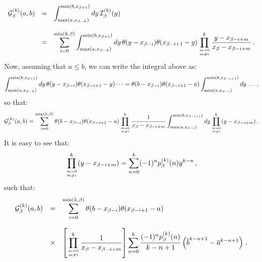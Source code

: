 \documentclass[10pt,a4paper]{article}
\begin{document}
\begin{equation}
\begin{array}{rcl}
\displaystyle \mathcal{G}_\beta^{(k)}(a,b) &=& \displaystyle
                                               \int_{{\rm
                                               max}(a,x_{\beta-k})}^{{\rm
                                               min}(b,x_{\beta+1})}
                                               dy\,\mathcal{I}_\beta^{(k)}(y)\\
\\
&=&\displaystyle 
\sum_{i=0}^{{\rm min}(k,\beta)}
  \int_{{\rm max}(a,x_{\beta-k})}^{{\rm min}(b,x_{\beta+1})}dy\,\theta(y-x_{\beta-i})\theta(x_{\beta-i+1}-y)
  \prod^{k}_{m=0\atop m\ne
    i}\frac{y-x_{\beta-i+m}}{x_{\beta}-x_{\beta-i+m}}\,.
\end{array}
\end{equation}
Now, assuming that $a\leq b$, we can write the integral above as:
\begin{equation}
\int_{{\rm max}(a,x_{\beta-k})}^{{\rm min}(b,x_{\beta+1})} dy\,\theta(y-x_{\beta-i})\theta(x_{\beta-i+1}-y)\dots
=\theta(b-x_{\beta-i})\theta(x_{\beta-i+1}-a)\int_{{\rm max}(a,x_{\beta-i})}^{{\rm min}(b,x_{\beta-i+1})}dy\dots\,,
\end{equation}
so that:
\begin{equation}
\mathcal{G}_\beta^{(k)}(a,b) = \sum_{i=0}^{{\rm min}(k,\beta)}
  \theta(b-x_{\beta-i})\theta(x_{\beta-i+1}-a)\prod^{k}_{m=0\atop m\ne
    i}\frac{1}{x_{\beta}-x_{\beta-i+m}}\int_{{\rm max}(a,x_{\beta-i})}^{{\rm min}(b,x_{\beta-i+1})}dy\prod^{k}_{m=0\atop m\ne
    i}(y-x_{\beta-i+m})\,.
\end{equation}
It is easy to see that:
\begin{equation}\label{eq:expansion}
\prod^{k}_{m=0\atop m\ne
i}(y-x_{\beta-i+m})=\sum_{n=0}^k (-1)^n p_{\beta}^{(k)}(n)y^{k-n}\,,
\end{equation}
such that:
\begin{equation}\label{eq:linIntegral}
\begin{array}{rcl}
\displaystyle \mathcal{G}_\beta^{(k)}(a,b) &=&\displaystyle  \sum_{i=0}^{{\rm min}(k,\beta)}
  \theta(b-x_{\beta-i})\theta(x_{\beta-i+1}-a)\\
\\
&\times&\displaystyle \left[\prod^{k}_{m=0\atop m\ne
    i}\frac{1}{x_{\beta}-x_{\beta-i+m}}\right]\sum_{n=0}^k
         \frac{(-1)^n p_{\beta}^{(k)}(n)}{k-n+1}
         \left(\overline{b}^{k-n+1}-\overline{a}^{k-n+1}\right)\,.
\end{array}
\end{equation}
\end{document}
